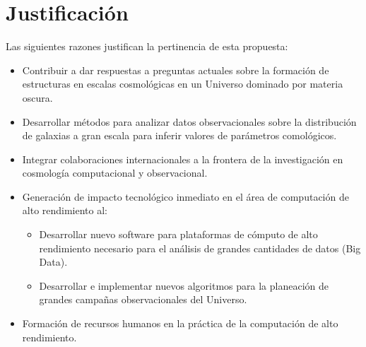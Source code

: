 
\section{Justificaci\'on}

Las siguientes razones justifican la pertinencia de esta propuesta:


\begin{itemize}
\item Contribuir a dar respuestas a preguntas actuales sobre la
  formaci\'on de estructuras en escalas cosmol\'ogicas en un Universo
  dominado por materia oscura.
\item Desarrollar m\'etodos para analizar datos observacionales 
  sobre la distribuci\'on de galaxias a gran escala para
  inferir valores de par\'ametros comol\'ogicos.
\item Integrar colaboraciones internacionales a la frontera de la
  investigaci\'on en cosmolog\'ia computacional y observacional.
\item Generaci\'on de impacto tecnol\'ogico inmediato en el \'area de
  computaci\'on de alto rendimiento al:
\begin{itemize}
\item Desarrollar nuevo software para plataformas de c\'omputo de alto
  rendimiento necesario para el an\'alisis de grandes cantidades de
  datos (Big Data).
\item Desarrollar e implementar nuevos algoritmos para la planeaci\'on
  de grandes campa\~nas observacionales del Universo.
\end{itemize}
\item Formaci\'on de recursos humanos en la pr\'actica de la
  computaci\'on de alto rendimiento.
\end{itemize}
